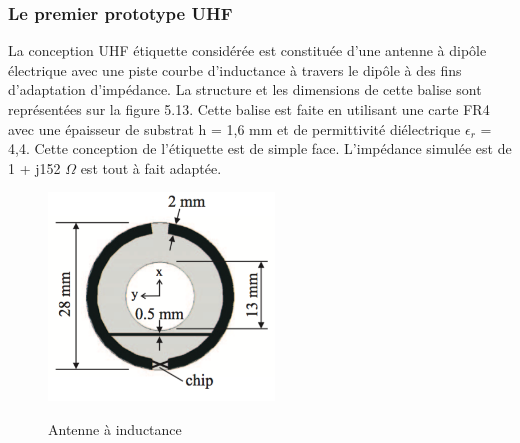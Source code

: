 \documentclass[11pt, a4paper, twoside]{book}
\begin{document}
\subsubsection{Le premier prototype UHF}


La conception UHF étiquette considérée est constituée d’une antenne à dipôle électrique avec une piste courbe d’inductance à travers le dipôle à des fins d'adaptation d'impédance. La structure et les dimensions de cette balise sont représentées sur la figure 5.13. Cette balise est faite en utilisant une carte FR4 avec une épaisseur de substrat h = 1,6 mm et de permittivité diélectrique \(\epsilon_{r}\) = 4,4. Cette conception de l’étiquette est de simple face. L'impédance simulée est de 1 + j152 \(\Omega\) est tout à fait adaptée.\\
 
 \begin{figure}[H]
\centering
\includegraphics[width=6cm]{dofi}\\
\caption{Antenne à inductance}
\end{figure} 
\end{document}
